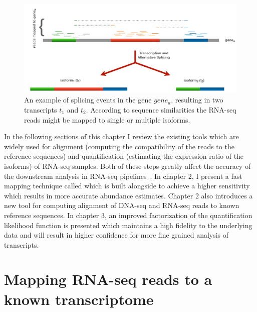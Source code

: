 \begin{figure}
 \centering
 \includegraphics[width=0.95\columnwidth]{Figures/intro/alt-splice.pdf}
 \caption[Alternative splicing of genes]{An example of splicing events in 
 the gene $gene_a$, resulting in two transcripts $t_1$ and $t_2$. According 
 to sequence similarities the RNA-seq reads might be mapped to single or 
 multiple isoforms.}
  \label{fig:altsplice}
\end{figure}

In the following sections of this chapter I review the existing tools which 
are widely used for alignment (computing the compatibility of the reads to 
the reference sequences) and quantification (estimating the expression ratio 
of the isoforms) of RNA-seq samples. Both of these steps greatly affect the 
accuracy of the downstream analysis in RNA-seq 
pipelines~\citep{srivastava2019alignment}. In chapter 2, 
I present a fast mapping technique called \sla which is built 
alongside \qm to achieve a higher sensitivity which results in more 
accurate abundance estimates. Chapter 2 also introduces a new tool for 
computing alignment of DNA-seq and RNA-seq reads to known reference sequences. 
In chapter 3, an improved factorization of the quantification likelihood 
function is presented which  maintains a high fidelity to the underlying 
data and will result in higher confidence for more fine grained analysis 
of transcripts. 

\section{Mapping RNA-seq reads to a known transcriptome}

